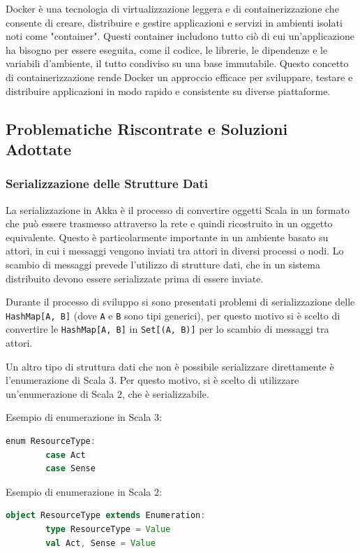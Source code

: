 \documentclass[12pt]{article}
\begin{document}
Docker è una tecnologia di virtualizzazione leggera e di containerizzazione che consente di creare, distribuire e gestire applicazioni e servizi in ambienti isolati noti come "container". Questi container includono tutto ciò di cui un'applicazione ha bisogno per essere eseguita, come il codice, le librerie, le dipendenze e le variabili d'ambiente, il tutto condiviso su una base immutabile. Questo concetto di containerizzazione rende Docker un approccio efficace per sviluppare, testare e distribuire applicazioni in modo rapido e consistente su diverse piattaforme.

\subsection{Problematiche Riscontrate e Soluzioni Adottate}

\subsubsection{Serializzazione delle Strutture Dati}

La serializzazione in Akka è il processo di convertire oggetti Scala in un formato che può essere trasmesso attraverso la rete e quindi ricostruito in un oggetto equivalente. Questo è particolarmente importante in un ambiente basato su attori, in cui i messaggi vengono inviati tra attori in diversi processi o nodi. Lo scambio di messaggi prevede l'utilizzo di strutture dati, che in un sistema distribuito devono essere serializzate prima di essere inviate.

Durante il processo di sviluppo si sono presentati problemi di serializzazione delle \verb|HashMap[A, B]| (dove \verb|A| e \verb|B| sono tipi generici), per questo motivo si è scelto di convertire le \verb|HashMap[A, B]| in \verb|Set[(A, B)]| per lo scambio di messaggi tra attori.

Un altro tipo di struttura dati che non è possibile serializzare direttamente è l'enumerazione di Scala 3. Per questo motivo, si è scelto di utilizzare un'enumerazione di Scala 2, che è serializzabile.

Esempio di enumerazione in Scala 3:

\begin{lstlisting}[language=Scala]
    enum ResourceType:
        case Act
        case Sense
\end{lstlisting}

Esempio di enumerazione in Scala 2:

\begin{lstlisting}[language=Scala]
    object ResourceType extends Enumeration:
        type ResourceType = Value
        val Act, Sense = Value
\end{lstlisting}
\end{document}
